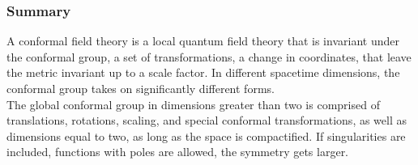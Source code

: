 \subsubsection*{Summary}

\noindent A conformal field theory is a local quantum field theory that is invariant under the conformal group, a set of transformations, a change in coordinates, that leave the metric invariant up to a scale factor. In different spacetime dimensions, the conformal group takes on significantly different forms. \\

\noindent The global conformal group in dimensions greater than two is comprised of translations, rotations, scaling, and special conformal transformations, as well as dimensions equal to two, as long as the space is compactified. If singularities are included, functions with poles are allowed, the symmetry gets larger.